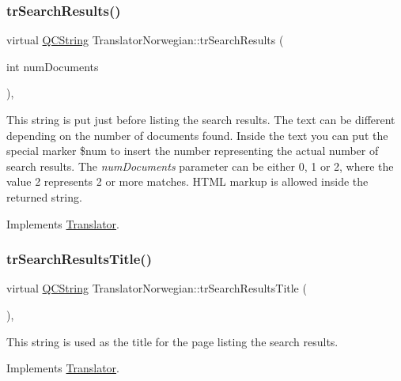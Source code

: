 \subsubsection{\texorpdfstring{trSearchResults()}{trSearchResults()}}
{\footnotesize\ttfamily virtual \mbox{\hyperlink{class_q_c_string}{Q\+C\+String}} Translator\+Norwegian\+::tr\+Search\+Results (\begin{DoxyParamCaption}\item[{int}]{num\+Documents }\end{DoxyParamCaption})\hspace{0.3cm}{\ttfamily [inline]}, {\ttfamily [virtual]}}

This string is put just before listing the search results. The text can be different depending on the number of documents found. Inside the text you can put the special marker \$num to insert the number representing the actual number of search results. The {\itshape num\+Documents} parameter can be either 0, 1 or 2, where the value 2 represents 2 or more matches. H\+T\+ML markup is allowed inside the returned string. 

Implements \mbox{\hyperlink{class_translator}{Translator}}.

\mbox{\label{class_translator_norwegian_a2840deb96af0a279a2221cd35db242e7}} 
\subsubsection{\texorpdfstring{trSearchResultsTitle()}{trSearchResultsTitle()}}
{\footnotesize\ttfamily virtual \mbox{\hyperlink{class_q_c_string}{Q\+C\+String}} Translator\+Norwegian\+::tr\+Search\+Results\+Title (\begin{DoxyParamCaption}{ }\end{DoxyParamCaption})\hspace{0.3cm}{\ttfamily [inline]}, {\ttfamily [virtual]}}

This string is used as the title for the page listing the search results. 

Implements \mbox{\hyperlink{class_translator}{Translator}}.

\mbox{\label{class_translator_norwegian_ad331eea92a6521513efff980c9a344a2}} 
